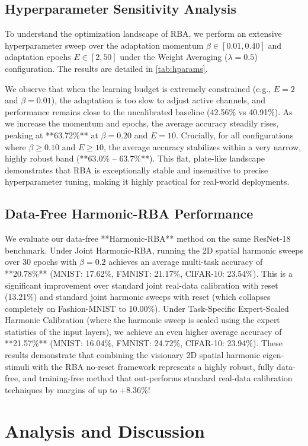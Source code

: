 \documentclass{article}
\begin{document}
\subsection{Hyperparameter Sensitivity Analysis}
To understand the optimization landscape of RBA, we perform an extensive hyperparameter sweep over the adaptation momentum $\beta \in [0.01, 0.40]$ and adaptation epochs $E \in [2, 50]$ under the Weight Averaging ($\lambda=0.5$) configuration. The results are detailed in \cref{tab:hparams}.

We observe that when the learning budget is extremely constrained (e.g., $E=2$ and $\beta=0.01$), the adaptation is too slow to adjust active channels, and performance remains close to the uncalibrated baseline (42.56\% vs 40.91\%). As we increase the momentum and epochs, the average accuracy steadily rises, peaking at **63.72\%** at $\beta=0.20$ and $E=10$. Crucially, for all configurations where $\beta \geq 0.10$ and $E \geq 10$, the average accuracy stabilizes within a very narrow, highly robust band (**63.0\% -- 63.7\%**). This flat, plate-like landscape demonstrates that RBA is exceptionally stable and insensitive to precise hyperparameter tuning, making it highly practical for real-world deployments.

\subsection{Data-Free Harmonic-RBA Performance}
We evaluate our data-free **Harmonic-RBA** method on the same ResNet-18 benchmark. 
Under Joint Harmonic-RBA, running the 2D spatial harmonic sweeps over 30 epochs with $\beta = 0.2$ achieves an average multi-task accuracy of **20.78\%** (MNIST: 17.62\%, FMNIST: 21.17\%, CIFAR-10: 23.54\%). This is a significant improvement over standard joint real-data calibration with reset (13.21\%) and standard joint harmonic sweeps with reset (which collapses completely on Fashion-MNIST to 10.00\%). 
Under Task-Specific Expert-Scaled Harmonic Calibration (where the harmonic sweep is scaled using the expert statistics of the input layers), we achieve an even higher average accuracy of **21.57\%** (MNIST: 16.04\%, FMNIST: 24.72\%, CIFAR-10: 23.94\%). These results demonstrate that combining the visionary 2D spatial harmonic eigen-stimuli with the RBA no-reset framework represents a highly robust, fully data-free, and training-free method that out-performs standard real-data calibration techniques by margins of up to +8.36\%!

\section{Analysis and Discussion}
\label{sec:discuss}
\end{document}
